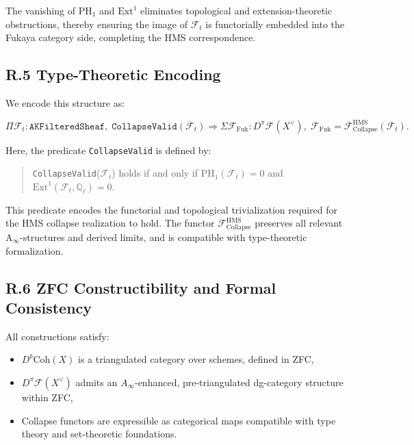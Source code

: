\documentclass[11pt]{article}
\begin{document}
The vanishing of \( \mathrm{PH}_1 \) and \( \mathrm{Ext}^1 \) eliminates topological and extension-theoretic obstructions, thereby ensuring the image of \( \mathcal{F}_t \) is functorially embedded into the Fukaya category side, completing the HMS correspondence.


\subsection*{R.5 Type-Theoretic Encoding}

We encode this structure as:

\[
\Pi \mathcal{F}_t : \texttt{AKFilteredSheaf},\;
\texttt{CollapseValid}(\mathcal{F}_t)
\Rightarrow
\Sigma \mathcal{F}_{\mathrm{Fuk}} : D^\pi\mathcal{F}(X^\vee),\;
\mathcal{F}_{\mathrm{Fuk}} = \mathcal{F}_{\mathrm{Collapse}}^{\mathrm{HMS}}(\mathcal{F}_t).
\]

Here, the predicate \texttt{CollapseValid} is defined by:

\begin{quote}
\texttt{CollapseValid}(\( \mathcal{F}_t \)) holds if and only if \( \mathrm{PH}_1(\mathcal{F}_t) = 0 \) and \( \mathrm{Ext}^1(\mathcal{F}_t, \mathbb{Q}_\ell) = 0 \).
\end{quote}

This predicate encodes the functorial and topological trivialization required for the HMS collapse realization to hold. The functor \( \mathcal{F}_{\mathrm{Collapse}}^{\mathrm{HMS}} \) preserves all relevant A$_\infty$-structures and derived limits, and is compatible with type-theoretic formalization.


\subsection*{R.6 ZFC Constructibility and Formal Consistency}

All constructions satisfy:

\begin{itemize}
  \item $D^b\mathrm{Coh}(X)$ is a triangulated category over schemes, defined in ZFC,
  \item $D^\pi\mathcal{F}(X^\vee)$ admits an $A_\infty$-enhanced, pre-triangulated dg-category structure within ZFC,
  \item Collapse functors are expressible as categorical maps compatible with type theory and set-theoretic foundations.
\end{itemize}
\end{document}
